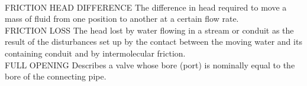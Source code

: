 \documentclass{article}
\begin{document}
\vspace{0.3cm}\\
FRICTION HEAD DIFFERENCE
The difference in head required to move a mass of fluid from one position to another at a certain flow rate.
\vspace{0.3cm}\\
FRICTION LOSS
The head lost by water flowing in a stream or conduit as the result of the disturbances set up by the contact between the moving water and its containing conduit and by intermolecular friction. 
\vspace{0.3cm}\\
FULL OPENING
Describes a valve whose bore (port) is nominally equal to the bore of the connecting pipe.
\vspace{0.3cm}\\
\end{document}
